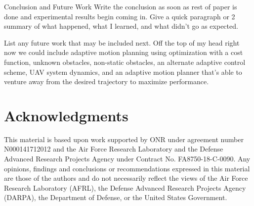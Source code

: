 
\begin{section}{Conclusion and Future Work} \label{sec:conclusion}
Write the conclusion as soon as rest of paper is done and experimental results begin coming in. Give a quick paragraph or 2 summary of what happened, what I learned, and what didn't go as expected.

List any future work that may be included next. Off the top of my head right now we could include adaptive motion planning using optimization with a cost function, unknown obstacles, non-static obstacles, an alternate adaptive control scheme, UAV system dynamics, and an adaptive motion planner that's able to venture away from the desired trajectory to maximize performance.

\end{section}

\section*{Acknowledgments} 
This material is based upon work supported by ONR under agreement number N000141712012 and 
the Air Force Research Laboratory and the Defense Advanced Research Projects Agency under Contract No. FA8750-18-C-0090. Any opinions, findings and conclusions or recommendations expressed in this material are those of the authors and do not necessarily reflect the views of the Air Force Research Laboratory (AFRL), the Defense Advanced Research Projects Agency (DARPA), the Department of Defense, or the United States Government. 



	
	

